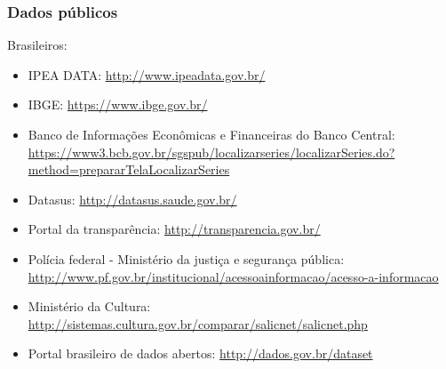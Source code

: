 \begin{frame}[allowframebreaks]
\frametitle{Dados públicos}
Brasileiros:
\begin{itemize}
\item IPEA DATA: \url{http://www.ipeadata.gov.br/}
\item IBGE: \url{https://www.ibge.gov.br/}
\item Banco de Informações Econômicas e Financeiras do Banco Central: \url{https://www3.bcb.gov.br/sgspub/localizarseries/localizarSeries.do?method=prepararTelaLocalizarSeries}
\item Datasus: \url{http://datasus.saude.gov.br/}
\item Portal da transparência: \url{http://transparencia.gov.br/}
\item Polícia federal - Ministério da justiça e segurança pública: \url{http://www.pf.gov.br/institucional/acessoainformacao/acesso-a-informacao}
\item Ministério da Cultura: \url{http://sistemas.cultura.gov.br/comparar/salicnet/salicnet.php}
\item Portal brasileiro de dados abertos: \url{http://dados.gov.br/dataset}
\end{itemize}


\end{frame}
